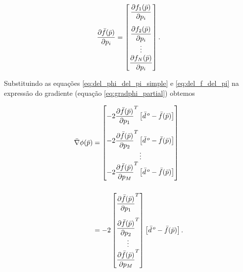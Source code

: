 \begin{equation}
\dfrac{\partial\vect{f}(\vect{p})}{\partial p_i} =
    \begin{bmatrix}
        \dfrac{\partial f_1(\vect{p})}{\partial p_i} \vspace{0.3cm}\\
        \dfrac{\partial f_2(\vect{p})}{\partial p_i}\\
        \vdots \\
        \dfrac{\partial f_N(\vect{p})}{\partial p_i}
    \end{bmatrix}.
\label{eq:del_f_del_pi}
\end{equation}

\indent Substituindo as equações \ref{eq:del_phi_del_pi_simple} e
\ref{eq:del_f_del_pi} na expressão do gradiente (equação \ref{eq:gradphi_partial})
obtemos

\begin{equation}
\begin{split}
\vect{\nabla} \phi(\vect{p}) &=
        \begin{bmatrix}
            -2\dfrac{\partial\vect{f}(\vect{p})}{\partial p_1}^T
                \left[\vect{d}^{\thinspace o} - \vect{f}(\vect{p})\right]
                \vspace{0.3cm} \\
            -2\dfrac{\partial\vect{f}(\vect{p})}{\partial p_2}^T
                \left[\vect{d}^{\thinspace o} - \vect{f}(\vect{p})\right]\\
            \vdots \\
            -2\dfrac{\partial\vect{f}(\vect{p})}{\partial p_M}^T
                \left[\vect{d}^{\thinspace o} - \vect{f}(\vect{p})\right]
        \end{bmatrix}
    \\[0.5cm] &=
        -2
        \begin{bmatrix}
            \dfrac{\partial\vect{f}(\vect{p})}{\partial p_1}^T\vspace{0.3cm} \\
            \dfrac{\partial\vect{f}(\vect{p})}{\partial p_2}^T \\
            \vdots \\
            \dfrac{\partial\vect{f}(\vect{p})}{\partial p_M}^T
        \end{bmatrix}
        \left[\vect{d}^{\thinspace o} - \vect{f}(\vect{p})\right].
\end{split}
\label{eq:gradphi_partial_f}
\end{equation}

